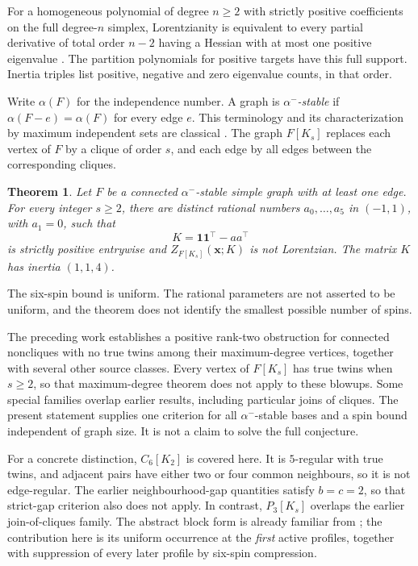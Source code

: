 \documentclass[11pt]{article}
\newtheorem{theorem}{Theorem}
\theoremstyle{remark}\newtheorem{remark}[theorem]{Remark}
\newcommand{\one}{\mathbf 1}
\begin{document}
For a homogeneous polynomial of degree $n\ge2$ with strictly positive
coefficients on the full degree-$n$ simplex, Lorentzianity is
equivalent to every partial derivative of total order $n-2$ having
a Hessian with at most one positive eigenvalue
\cite[Theorem 2.25]{BH}. The partition polynomials for positive
targets have this full support. Inertia triples list positive,
negative and zero eigenvalue counts, in that order.

Write $\alpha(F)$ for the independence number. A graph is
\emph{$\alpha^-$-stable} if $\alpha(F-e)=\alpha(F)$ for every edge $e$.
This terminology and its characterization by maximum independent
sets are classical \cite[Theorem 2.1]{LM}. The graph $F[K_s]$ replaces
each vertex of $F$ by a clique of order $s$, and each edge by all
edges between the corresponding cliques.

\newpage
\begin{theorem}\label{thm:main}
Let $F$ be a connected $\alpha^-$-stable simple graph with at least
one edge. For every integer $s\ge2$, there are distinct rational
numbers $a_0,\ldots,a_5$ in $(-1,1)$, with $a_1=0$, such that
\[
 K=\one\one^\top-aa^\top
\]
is strictly positive entrywise and
$Z_{F[K_s]}(\mathbf x;K)$ is not Lorentzian.
The matrix $K$ has inertia $(1,1,4)$.
\end{theorem}

The six-spin bound is uniform. The rational parameters are not
asserted to be uniform, and the theorem does not identify the
smallest possible number of spins.

The preceding work \cite{Eriksson} establishes a positive rank-two
obstruction for connected noncliques with no true twins among their
maximum-degree vertices, together with several other source classes.
Every vertex of $F[K_s]$ has true twins when $s\ge2$, so that
maximum-degree theorem does not apply to these blowups. Some special
families overlap earlier results, including particular joins of
cliques. The present statement supplies one criterion for all
$\alpha^-$-stable bases and a spin bound independent of graph size.
It is not a claim to solve the full conjecture.

For a concrete distinction, $C_6[K_2]$ is covered here. It is
$5$-regular with true twins, and adjacent pairs have either two
or four common neighbours, so it is not edge-regular. The earlier
neighbourhood-gap quantities satisfy $b=c=2$, so that strict-gap
criterion also does not apply. In contrast, $P_3[K_s]$ overlaps
the earlier join-of-cliques family. The abstract block form is
already familiar from \cite{Eriksson}; the contribution here is
its uniform occurrence at the \emph{first} active profiles, together
with suppression of every later profile by six-spin compression.
\end{document}
